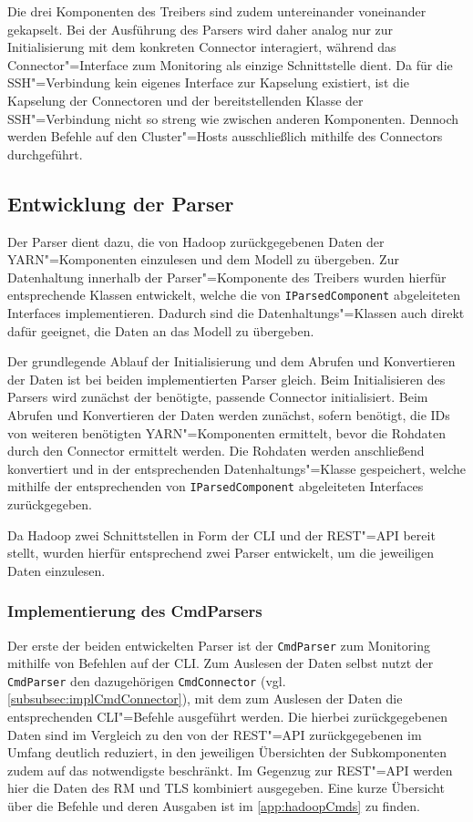 Die drei Komponenten des Treibers sind zudem untereinander  voneinander gekapselt.
Bei der Ausführung des Parsers wird daher analog nur zur Initialisierung mit dem konkreten Connector interagiert, während das Connector"=Interface zum Monitoring als einzige Schnittstelle dient.
Da für die SSH"=Verbindung kein eigenes Interface zur Kapselung existiert, ist die Kapselung der Connectoren und der bereitstellenden Klasse der SSH"=Verbindung nicht so streng wie zwischen anderen Komponenten.
Dennoch werden Befehle auf den Cluster"=Hosts ausschließlich mithilfe des Connectors durchgeführt.

\subsection{Entwicklung der Parser}
\label{subsec:implementedParsers}

Der Parser dient dazu, die von Hadoop zurückgegebenen Daten der \ac{YARN}"=Komponenten einzulesen und dem Modell zu übergeben.
Zur Datenhaltung innerhalb der Parser"=Komponente des Treibers wurden hierfür entsprechende Klassen entwickelt, welche die von \texttt{IParsedComponent} abgeleiteten Interfaces implementieren.
Dadurch sind die Datenhaltungs"=Klassen auch direkt dafür geeignet, die Daten an das Modell zu übergeben.

Der grundlegende Ablauf der Initialisierung und dem Abrufen und Konvertieren der Daten ist bei beiden implementierten Parser gleich.
Beim Initialisieren des Parsers wird zunächst der benötigte, passende Connector initialisiert.
Beim Abrufen und Konvertieren der Daten werden zunächst, sofern benötigt, die IDs von weiteren benötigten \ac{YARN}"=Komponenten ermittelt, bevor die Rohdaten durch den Connector ermittelt werden.
Die Rohdaten werden anschließend konvertiert und in der entsprechenden Datenhaltungs"=Klasse gespeichert, welche mithilfe der entsprechenden von \texttt{IParsedComponent} abgeleiteten Interfaces zurückgegeben.

Da Hadoop zwei Schnittstellen in Form der \ac{CLI} und der REST"=API bereit stellt, wurden hierfür entsprechend zwei Parser entwickelt, um die jeweiligen Daten einzulesen.

\subsubsection{Implementierung des CmdParsers}
\label{subsubsec:implCmdParser}

Der erste der beiden entwickelten Parser ist der \texttt{CmdParser} zum Monitoring mithilfe von Befehlen auf der \ac{CLI}.
Zum Auslesen der Daten selbst nutzt der \texttt{CmdParser} den dazugehörigen \texttt{CmdConnector} (vgl. \cref{subsubsec:implCmdConnector}), mit dem zum Auslesen der Daten die entsprechenden \ac{CLI}"=Befehle ausgeführt werden.
Die hierbei zurückgegebenen Daten sind im Vergleich zu den von der REST"=API zurückgegebenen im Umfang deutlich reduziert, in den jeweiligen Übersichten der Subkomponenten zudem auf das notwendigste beschränkt.
Im Gegenzug zur REST"=API werden hier die Daten des \ac{RM} und \ac{TLS} kombiniert ausgegeben.
Eine kurze Übersicht über die Befehle und deren Ausgaben ist im \cref{app:hadoopCmds} zu finden.

